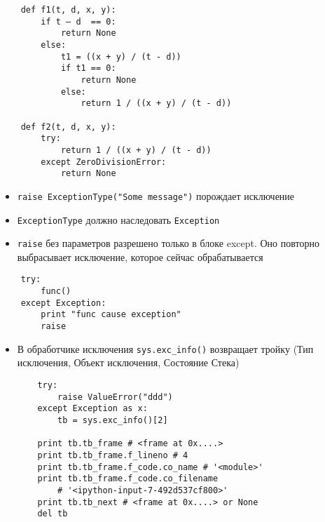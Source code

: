 \documentclass{article}
\begin{document}
\newpage

{
\LARGE \vspace{15pt}
\begin{lstlisting}
	def f1(t, d, x, y):
		if t – d  == 0:
		    return None
		else:
		    t1 = ((x + y) / (t - d))
		    if t1 == 0:
		        return None
		    else:
		        return 1 / ((x + y) / (t - d))

	def f2(t, d, x, y):
		try:
		    return 1 / ((x + y) / (t - d))
		except ZeroDivisionError:
		    return None

\end{lstlisting}
}

\newpage


\begin{itemize}
\item \lstinline!raise ExceptionType("Some message")! порождает исключение
\item \lstinline!ExceptionType! должно наследовать \lstinline!Exception!
\item \lstinline!raise! без параметров разрешено только в блоке except. 
	Оно повторно выбрасывает исключение, которое сейчас обрабатывается
\end{itemize}
{
\LARGE \vspace{15pt}
\begin{lstlisting}
	try:
		func()
	except Exception:
		print "func cause exception"
		raise
\end{lstlisting}
}

\newpage

\begin{itemize}
\item В обработчике исключения \lstinline!sys.exc_info()! возвращает тройку
	(Тип исключения, Объект исключения, Состояние Стека)

{
\LARGE \vspace{15pt}
\begin{lstlisting}
	try:
	    raise ValueError("ddd")
	except Exception as x:
		tb = sys.exc_info()[2]

	print tb.tb_frame # <frame at 0x....>
	print tb.tb_frame.f_lineno # 4
	print tb.tb_frame.f_code.co_name # '<module>'
	print tb.tb_frame.f_code.co_filename 
		# '<ipython-input-7-492d537cf800>'
	print tb.tb_next # <frame at 0x....> or None
	del tb
\end{lstlisting}
}

\end{itemize}
\newpage
\end{document}
